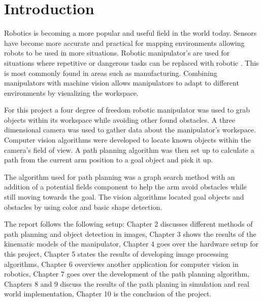 \chapter{Introduction}
 Robotics is becoming a more popular and useful field in the world today. Sensors have become more accurate and practical for mapping environments allowing robots to be used in more situations. Robotic manipulator's are used for situations where repetitive or dangerous tasks can be replaced with robotic . This is most commonly found in areas such as manufacturing. Combining manipulators with machine vision allows manipulators to adapt to different environments by visualizing the workspace.
 
 For this project a four degree of freedom robotic manipulator was used to grab objects within its workspace while avoiding other found obstacles. A three dimensional camera was used to gather data about the manipulator's workspace. Computer vision algorithms were developed to locate known objects within the camera's field of view. A path planning algorithm was then set up to calculate a path from the current arm position to a goal object and pick it up. 
 
 The algorithm used for path planning was a graph search method with an addition of a potential fields component to help the arm avoid obstacles while still moving towards the goal. The vision algorithms located goal objects and obstacles by using color and basic shape detection.  
 
 The report follows the following setup: Chapter 2 discusses different methods of path planning and object detection in images, Chapter 3 shows the results of the kinematic models of the manipulator, Chapter 4 goes over the hardware setup for this project, Chapter 5 states the results of developing image processing algorithms, Chapter 6 overviews another application for computer vision in robotics, Chapter 7 goes over the development of the path planning algorithm, Chapters 8 and 9 discuss the results of the path planing in simulation and real world implementation, Chapter 10 is the conclusion of the project.